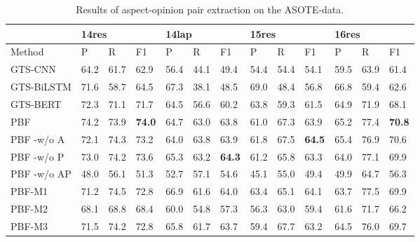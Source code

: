 \documentclass[11pt]{article}
\begin{document}
\begin{table*}
	\centering
	\begin{tabular}{|l|l|l|l|l|l|l|l|l|l|l|l|l|}
		\hline
		& \multicolumn{3}{l|}{14res} & \multicolumn{3}{l|}{14lap}  & \multicolumn{3}{l|}{15res}  & \multicolumn{3}{l|}{16res}  \\ \hline
		Method      & P     & R    & F1          & P    & R    & F1            & P    & R    & F1            & P    & R    & F1            \\ \hline
		GTS-CNN     & 64.2  & 61.7 & 62.9        & 56.4 & 44.1 & 49.4          & 54.4 & 54.4 & 54.1          & 59.5 & 63.9 & 61.4          \\ \hline
		GTS-BiLSTM  & 71.6  & 58.7 & 64.5        & 67.3 & 38.1 & 48.5          & 69.0   & 48.4 & 56.8          & 66.8 & 59.4 & 62.6          \\ \hline
		GTS-BERT    & 72.3  & 71.1 & 71.7        & 64.5 & 56.6 & 60.2          & 63.8 & 59.3 & 61.5          & 64.9 & 71.9 & 68.1          \\ \hline
		PBF         & 74.2  & 73.9 & \textbf{74.0} & 64.7 & 63.0   & 63.8          & 61.0   & 67.3 & 63.9          & 65.2 & 77.4 & \textbf{70.8} \\ \hline
		PBF -w/o A  & 72.1  & 74.3 & 73.2        & 64.0   & 63.8 & 63.9          & 61.8 & 67.5 & \textbf{64.5} & 65.4 & 76.9 & 70.6          \\ \hline
		PBF -w/o P  & 73.0    & 74.2 & 73.6        & 65.3 & 63.2 & \textbf{64.3} & 61.2 & 65.8 & 63.3          & 64.0   & 77.1 & 69.9          \\ \hline
		PBF -w/o AP & 48.0    & 56.1 & 51.3        & 52.7 & 57.1 & 54.6          & 45.1 & 55.0   & 49.4          & 49.9 & 64.7 & 56.3          \\ \hline
		PBF-M1      & 71.2  & 74.5 & 72.8        & 66.9 & 61.6 & 64.0            & 63.4 & 65.1 & 64.1          & 63.7 & 77.5 & 69.9          \\ \hline
		PBF-M2      & 68.1  & 68.8 & 68.4        & 60.0   & 54.8 & 57.3          & 56.3 & 63.0   & 59.4          & 61.6 & 71.7 & 66.2          \\ \hline
		PBF-M3      & 71.5  & 74.2 & 72.8        & 65.8 & 61.7 & 63.7          & 59.4 & 67.7 & 63.2          & 64.5 & 76.0   & 69.7          \\ \hline
	\end{tabular}
	\caption{\label{table:AOPE-more} Results of aspect-opinion pair extraction on the ASOTE-data.}
\end{table*}
\end{document}
